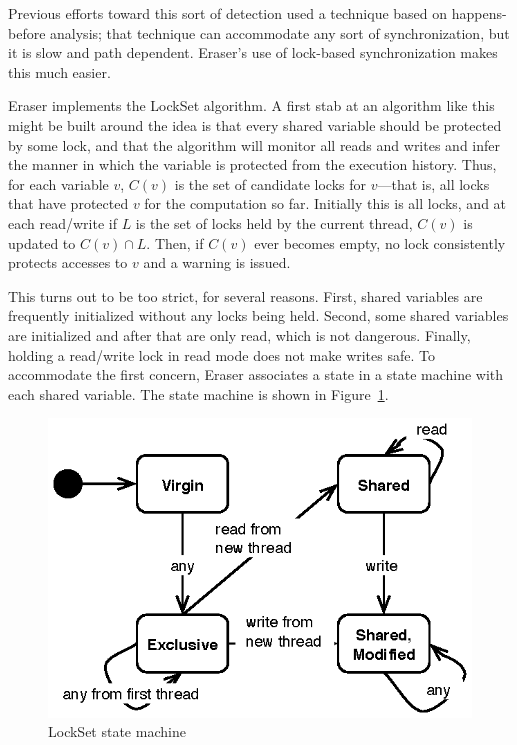 \documentclass{article}
\begin{document}
\begin{multicols}{2}
Previous efforts toward this sort of detection used a technique based
on happens-before analysis; that technique can accommodate any sort of
synchronization, but it is slow and path dependent.  Eraser's use of
lock-based synchronization makes this much easier.

Eraser implements the LockSet algorithm.  A first stab at an algorithm
like this might be built around the idea is that every shared variable
should be protected by some lock, and that the algorithm will monitor
all reads and writes and infer the manner in which the variable is
protected from the execution history.  Thus, for each variable $v$,
$C(v)$ is the set of candidate locks for $v$---that is, all locks that
have protected $v$ for the computation so far.  Initially this is all
locks, and at each read/write if $L$ is the set of locks held by the
current thread, $C(v)$ is updated to $C(v) \cap L$.  Then, if $C(v)$
ever becomes empty, no lock consistently protects accesses to $v$ and
a warning is issued.

This turns out to be too strict, for several reasons.  First, shared
variables are frequently initialized without any locks being held.
Second, some shared variables are initialized and after that are only
read, which is not dangerous.  Finally, holding a read/write lock in
read mode does not make writes safe.  To accommodate the first
concern, Eraser associates a state in a state machine with each shared
variable.  The state machine is shown in Figure~\ref{fig:eraser}.

\begin{figure}
  \begin{center}
    \leavevmode
    \includegraphics{eraser}
  \end{center}
  \caption{LockSet state machine}
  \label{fig:eraser}
\end{figure}


\end{multicols}
\end{document}

